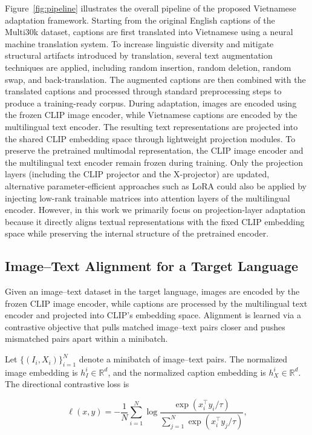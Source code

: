 Figure~\ref{fig:pipeline} illustrates the overall pipeline of the proposed Vietnamese adaptation framework. Starting from the original English captions of the Multi30k dataset, captions are first translated into Vietnamese using a neural machine translation system. To increase linguistic diversity and mitigate structural artifacts introduced by translation, several text augmentation techniques are applied, including random insertion, random deletion, random swap, and back-translation. The augmented captions are then combined with the translated captions and processed through standard preprocessing steps to produce a training-ready corpus. During adaptation, images are encoded using the frozen CLIP image encoder, while Vietnamese captions are encoded by the multilingual text encoder. The resulting text representations are projected into the shared CLIP embedding space through lightweight projection modules. To preserve the pretrained multimodal representation, the CLIP image encoder and the multilingual text encoder remain frozen during training. Only the projection layers (including the CLIP projector and the X-projector) are updated, alternative parameter-efficient approaches such as LoRA could also be applied by injecting low-rank trainable matrices into attention layers of the multilingual encoder. However, in this work we primarily focus on projection-layer adaptation because it directly aligns textual representations with the fixed CLIP embedding space while preserving the internal structure of the pretrained encoder.



\subsection{Image--Text Alignment for a Target Language}

Given an image–text dataset in the target language, images are encoded by the frozen CLIP image encoder, while captions are processed by the multilingual text encoder and projected into CLIP’s embedding space. Alignment is learned via a contrastive objective that pulls matched image–text pairs closer and pushes mismatched pairs apart within a minibatch.

Let $\{(I_i, X_i)\}_{i=1}^{N}$ denote a minibatch of image–text pairs. The normalized image embedding is $h_I^i \in \mathbb{R}^d$, and the normalized caption embedding is $h_X^i \in \mathbb{R}^d$. The directional contrastive loss is

\[
\ell(x, y)
=
-
\frac{1}{N}
\sum_{i=1}^{N}
\log
\frac{\exp(x_i^\top y_i / \tau)}
{\sum_{j=1}^{N} \exp(x_i^\top y_j / \tau)},
\]


